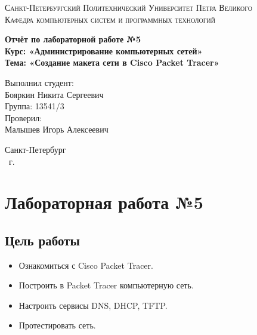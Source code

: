 \documentclass[14pt,a4paper,report]{report}
\begin{document}
\def\contentsname{Содержание}

\begin{titlepage}
	\begin{center}
		\textsc{Санкт-Петербургский Политехнический 
			Университет Петра Великого\\[5mm]
			Кафедра компьютерных систем и программных технологий}
		
		\vfill
		
		\textbf{Отчёт по лабораторной работе №5\\[3mm]
			Курс: «Администрирование компьютерных сетей»\\[3mm]
			Тема: «Создание макета сети в Cisco Packet Tracer»\\[35mm]
			}
	\end{center}
	
	\hfill
	\begin{minipage}{.5\textwidth}
		Выполнил студент:\\[2mm] 
		Бояркин Никита Сергеевич\\
		Группа: 13541/3\\[5mm]
		
		Проверил:\\[2mm] 
		Малышев Игорь Алексеевич
	\end{minipage}
	\vfill
	\begin{center}
		Санкт-Петербург\\ \the\year\ г.
	\end{center}
\end{titlepage}

\tableofcontents
\clearpage

\chapter{Лабораторная работа №5}

\section{Цель работы}

\begin{itemize}
	\item Ознакомиться с Cisco Packet Tracer.
	\item Построить в Packet Tracer компьютерную сеть.
	\item Настроить сервисы DNS, DHCP, TFTP.
	\item Протестировать сеть.
\end{itemize}
\end{document}
